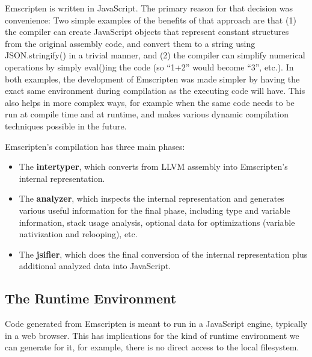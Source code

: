 \documentclass[preprint,10pt]{sigplanconf}
\begin{document}
Emscripten is written in JavaScript. The primary reason for that decision
was convenience: Two simple examples of the benefits of that approach are that (1)
the compiler can create JavaScript objects that represent constant structures from the original
assembly code, and convert them to a string using JSON.stringify()
in a trivial manner,
and (2) the compiler can simplify numerical operations by simply
eval()ing the code (so ``1+2'' would become ``3'', etc.). In both examples,
the development of Emscripten was made simpler by having the exact same environment
during compilation as the executing code will have. This also helps in more
complex ways, for example when the same code needs to be run at compile time
and at runtime, and makes various dynamic compilation techniques possible in the future.

Emscripten's compilation has three main phases:
\begin{itemize}
\item The \textbf{intertyper}, which converts from LLVM assembly into
      Emscripten's internal representation.
\item The \textbf{analyzer}, which inspects the internal representation
      and generates various useful information for the final phase,
      including type and variable information, stack usage analysis,
      optional data for optimizations
      (variable nativization and relooping), etc.
\item The \textbf{jsifier}, which does the final conversion of the
      internal representation plus additional analyzed data into JavaScript.
\end{itemize}

\subsection{The Runtime Environment}
\label{sec:runtime}

Code generated from Emscripten is meant to run in a JavaScript engine,
typically in a web browser. This has implications for the kind of
runtime environment we can generate for it, for example, there is no
direct access to the local filesystem.
\end{document}
